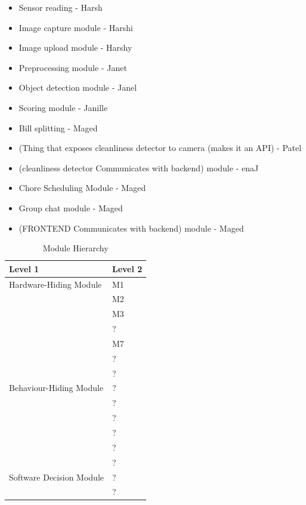 \documentclass[12pt, titlepage]{article}
\begin{document}
\begin{itemize}
\item Sensor reading - Harsh
\item Image capture module - Harshi
\item Image upload module - Harshy
\item Preprocessing module - Janet
\item Object detection module - Janel
\item Scoring module - Janille
\item Bill splitting - Maged
\item (Thing that exposes cleanliness detector to camera (makes it an API) - Patel
\item (cleanliness detector Communicates with backend) module - enaJ
\item Chore Scheduling Module - Maged
\item Group chat module - Maged
\item (FRONTEND Communicates with backend) module - Maged

\end{itemize}
\begin{table}[h!]
\centering
\begin{tabular}{p{} p{}}
\toprule
\textbf{Level 1} & \textbf{Level 2}\\
\midrule

{Hardware-Hiding Module} & M1\\
& M2\\
& M3\\
& ?\\
\midrule

\multirow{7}{0.3\textwidth}{Behaviour-Hiding Module} & M7\\
& ?\\
& ?\\
& ?\\
& ?\\
& ?\\
& ?\\ 
& ?\\
\midrule

\multirow{3}{0.3\textwidth}{Software Decision Module} & {?}\\
& ?\\
& ?\\
\bottomrule

\end{tabular}
\caption{Module Hierarchy}
\label{TblMH}
\end{table}
\end{document}
